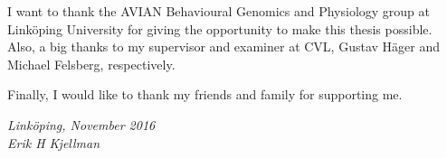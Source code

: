 \begin{acknowledgments}
  I want to thank the AVIAN Behavioural Genomics and Physiology group at Linköping University for giving the opportunity to make this thesis possible. Also, a big thanks to my supervisor and examiner at CVL, Gustav Häger and Michael Felsberg, respectively.

Finally, I would like to thank my friends and family for supporting me. 

  \addvspace{1em}
  \begin{flushright}
    \textit{%
      Linköping, November 2016\\
      Erik H Kjellman%
    }
  \end{flushright}
\end{acknowledgments}
